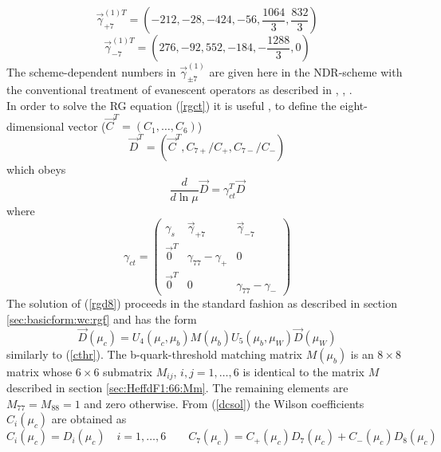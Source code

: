 \begin{equation}\label{gp71}
\vec\gamma^{(1)T}_{+7}=
\left(-212,-28,-424,-56,\frac{1064}{3},\frac{832}{3}\right)
\end{equation}
\begin{equation}\label{gm71}
\vec\gamma^{(1)T}_{-7}=
\left(276,-92,552,-184,-\frac{1288}{3},0 \right)
\end{equation}
The scheme-dependent numbers in $\vec\gamma^{(1)}_{\pm 7}$ are given
here in the NDR-scheme with the conventional treatment of evanescent
operators as described in \cite{burasweisz:90}, \cite{herrlichnierste:95},
\cite{nierste:95}.
\\
In order to solve the RG equation (\ref{rgct}) it is useful
\cite{herrlichnierste:95}, \cite{nierste:95} to define the
eight-dimensional vector ($\vec C^T=(C_1,\ldots,C_6)$)
\begin{equation}\label{d8def}
\vec D^T=(\vec C^T,C_{7+}/C_+,C_{7-}/C_-)
\end{equation}
which obeys
\begin{equation}\label{rgd8}
\frac{d}{d\ln\mu}\vec D=\gamma^T_{ct}\vec D
\end{equation}
where
\begin{equation}\label{gct8}
\gamma_{ct}=
\left(\begin{array}{ccc}
\gamma_s & \vec\gamma_{+7} & \vec\gamma_{-7} \\
\vec 0^T & \gamma_{77}-\gamma_+ & 0 \\
\vec 0^T & 0 & \gamma_{77}-\gamma_-
\end{array}\right)
\end{equation}
The solution of (\ref{rgd8}) proceeds in the standard fashion as
described in section \ref{sec:basicform:wc:rgf} and has the form
\begin{equation}\label{dcsol}
\vec D(\mu_c)=U_4(\mu_c,\mu_b)M(\mu_b)U_5(\mu_b,\mu_W)\vec D(\mu_W)
\end{equation}
similarly to (\ref{cthr}).
The b-quark-threshold matching matrix $M(\mu_b)$ is an $8\times 8$ 
matrix whose $6\times 6$ submatrix $M_{ij}$, $i,j=1,\ldots,6$
is identical to the matrix $M$ described in section
\ref{sec:HeffdF1:66:Mm}. The remaining elements are $M_{77}=M_{88}=1$
and zero otherwise.
From (\ref{dcsol}) the Wilson coefficients $C_i(\mu_c)$ are
obtained as
\begin{equation}\label{cdrel}
C_i(\mu_c)=D_i(\mu_c)\quad i=1,\ldots,6\qquad
C_7(\mu_c)=C_+(\mu_c)D_7(\mu_c)+C_-(\mu_c)D_8(\mu_c)
\end{equation}

